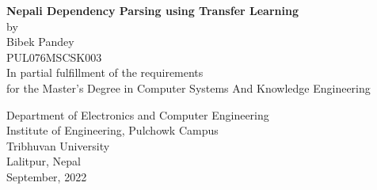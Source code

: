 \begin{titlingpage} 
\begin{center}
\textbf{Nepali Dependency Parsing using Transfer Learning}\\
\vspace{2cm}
by\\
Bibek Pandey\\
PUL076MSCSK003\\
\vspace{3cm}
\vspace{3cm}
In partial fulfillment of the requirements\\
for the Master’s Degree in Computer Systems And Knowledge Engineering
\vspace{2cm}

Department of Electronics and Computer Engineering\\
Institute of Engineering, Pulchowk Campus\\
Tribhuvan University\\
Lalitpur, Nepal\\
\vspace{2cm}
September, 2022
\end{center}
\end{titlingpage}
\newpage
